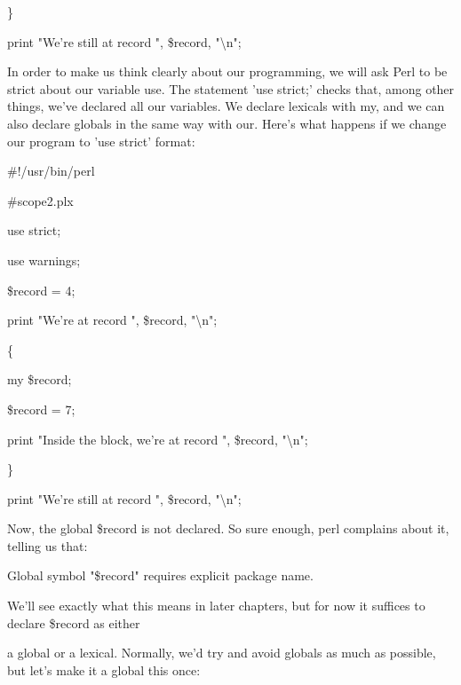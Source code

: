 \documentclass[a4paper,11pt]{book}
\begin{document}
\noindent 

\noindent \}

\noindent 

\noindent print "We're still at record ", \$record, "\textbackslash n";

\noindent 

\noindent In order to make us think clearly about our programming, we will ask Perl to be strict about our variable use. The statement 'use strict;' checks that, among other things, we've declared all our variables. We declare lexicals with my, and we can also declare globals in the same way with our. Here's what happens if we change our program to 'use strict' format:

\noindent 

\noindent \#!/usr/bin/perl

\noindent \#scope2.plx

\noindent use strict;

\noindent use warnings;

\noindent \$record = 4;

\noindent print "We're at record ", \$record, "\textbackslash n";

\noindent 

\noindent \{

\noindent my \$record;

\noindent \$record = 7;

\noindent print "Inside the block, we're at record ", \$record, "\textbackslash n";

\noindent \}

\noindent 

\noindent print "We're still at record ", \$record, "\textbackslash n";

\noindent 

\noindent Now, the global \$record is not declared. So sure enough, perl complains about it, telling us that:

\noindent 

\noindent Global symbol "\$record" requires explicit package name.

\noindent 

\noindent 

\noindent We'll see exactly what this means in later chapters, but for now it suffices to declare \$record as either

\noindent a global or a lexical. Normally, we'd try and avoid globals as much as possible, but let's make it a global this once:

\noindent 
\end{document}

